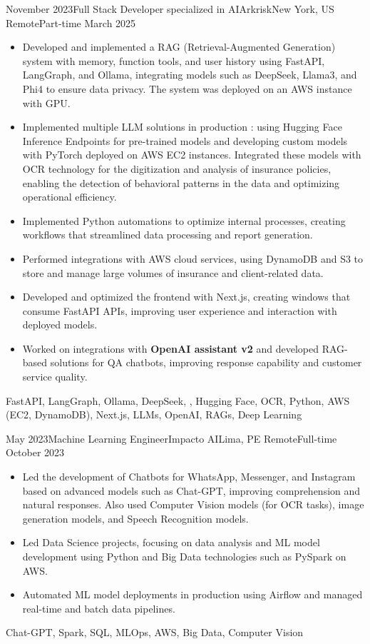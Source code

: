 \begin{experiences}
\emptySeparator
\experience
  {November 2023}{Full Stack Developer specialized in AI}{Arkrisk}{New York, US}
  {Remote}{Part-time}
  {March 2025} {
    \begin{itemize}
      \item Developed and implemented a RAG (Retrieval-Augmented Generation) system with memory, function tools, and user history using FastAPI, LangGraph, and Ollama, integrating models such as DeepSeek, Llama3, and Phi4 to ensure data privacy. The system was deployed on an AWS instance with GPU.
      \item Implemented multiple LLM solutions in production : using Hugging Face Inference Endpoints for pre-trained models and developing custom models with PyTorch deployed on AWS EC2 instances. Integrated these models with OCR technology for the digitization and analysis of insurance policies, enabling the detection of behavioral patterns in the data and optimizing operational efficiency.
      \item Implemented Python automations to optimize internal processes, creating workflows that streamlined data processing and report generation.
      \item Performed integrations with AWS cloud services, using DynamoDB and S3 to store and manage large volumes of insurance and client-related data.
      \item Developed and optimized the frontend with Next.js, creating windows that consume FastAPI APIs, improving user experience and interaction with deployed models.
      \item Worked on integrations with \textbf{OpenAI assistant v2} and developed RAG-based solutions for QA chatbots, improving response capability and customer service quality.
    \end{itemize}
  }
  {FastAPI, LangGraph, Ollama, DeepSeek, , Hugging Face, OCR, Python, {AWS (EC2, DynamoDB)}, Next.js, LLMs, OpenAI, RAGs, Deep Learning}

\emptySeparator
\experience
  {May 2023}{Machine Learning Engineer}{Impacto AI}{Lima, PE}
  {Remote}{Full-time}
  {October 2023} {
    \begin{itemize}
      \item Led the development of Chatbots for WhatsApp, Messenger, and Instagram based on advanced models such as Chat-GPT, improving comprehension and natural responses. Also used Computer Vision models (for OCR tasks), image generation models, and Speech Recognition models.
      \item Led Data Science projects, focusing on data analysis and ML model development using Python and Big Data technologies such as PySpark on AWS.
      \item Automated ML model deployments in production using Airflow and managed real-time and batch data pipelines.
    \end{itemize}
  }
  {Chat-GPT, Spark, SQL, MLOps, AWS, Big Data, Computer Vision}


\end{experiences}
